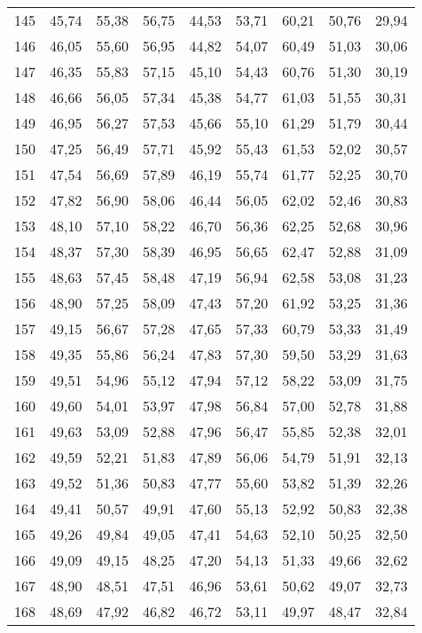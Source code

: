 \begin{longtable}{c c c c c c c c c}
145	& 45,74	& 55,38	& 56,75	& 44,53	& 53,71	& 60,21	& 50,76	& 29,94 \\
146	& 46,05	& 55,60	& 56,95	& 44,82	& 54,07	& 60,49	& 51,03	& 30,06 \\
147	& 46,35	& 55,83	& 57,15	& 45,10	& 54,43	& 60,76	& 51,30	& 30,19 \\
148	& 46,66	& 56,05	& 57,34	& 45,38	& 54,77	& 61,03	& 51,55	& 30,31 \\
149	& 46,95	& 56,27	& 57,53	& 45,66	& 55,10	& 61,29	& 51,79	& 30,44 \\
150	& 47,25	& 56,49	& 57,71	& 45,92	& 55,43	& 61,53	& 52,02	& 30,57 \\
151	& 47,54	& 56,69	& 57,89	& 46,19	& 55,74	& 61,77	& 52,25	& 30,70 \\
152	& 47,82	& 56,90	& 58,06	& 46,44	& 56,05	& 62,02	& 52,46	& 30,83 \\
153	& 48,10	& 57,10	& 58,22	& 46,70	& 56,36	& 62,25	& 52,68	& 30,96 \\
154	& 48,37	& 57,30	& 58,39	& 46,95	& 56,65	& 62,47	& 52,88	& 31,09 \\
155	& 48,63	& 57,45	& 58,48	& 47,19	& 56,94	& 62,58	& 53,08	& 31,23 \\
156	& 48,90	& 57,25	& 58,09	& 47,43	& 57,20	& 61,92	& 53,25	& 31,36 \\
157	& 49,15	& 56,67	& 57,28	& 47,65	& 57,33	& 60,79	& 53,33	& 31,49 \\
158	& 49,35	& 55,86	& 56,24	& 47,83	& 57,30	& 59,50	& 53,29	& 31,63 \\
159	& 49,51	& 54,96	& 55,12	& 47,94	& 57,12	& 58,22	& 53,09	& 31,75 \\
160	& 49,60	& 54,01	& 53,97	& 47,98	& 56,84	& 57,00	& 52,78	& 31,88 \\
161	& 49,63	& 53,09	& 52,88	& 47,96	& 56,47	& 55,85	& 52,38	& 32,01 \\
162	& 49,59	& 52,21	& 51,83	& 47,89	& 56,06	& 54,79	& 51,91	& 32,13 \\
163	& 49,52	& 51,36	& 50,83	& 47,77	& 55,60	& 53,82	& 51,39	& 32,26 \\
164	& 49,41	& 50,57	& 49,91	& 47,60	& 55,13	& 52,92	& 50,83	& 32,38 \\
165	& 49,26	& 49,84	& 49,05	& 47,41	& 54,63	& 52,10	& 50,25	& 32,50 \\
166	& 49,09	& 49,15	& 48,25	& 47,20	& 54,13	& 51,33	& 49,66	& 32,62 \\
167	& 48,90	& 48,51	& 47,51	& 46,96	& 53,61	& 50,62	& 49,07	& 32,73 \\
168	& 48,69	& 47,92	& 46,82	& 46,72	& 53,11	& 49,97	& 48,47	& 32,84 \\

\end{longtable}

